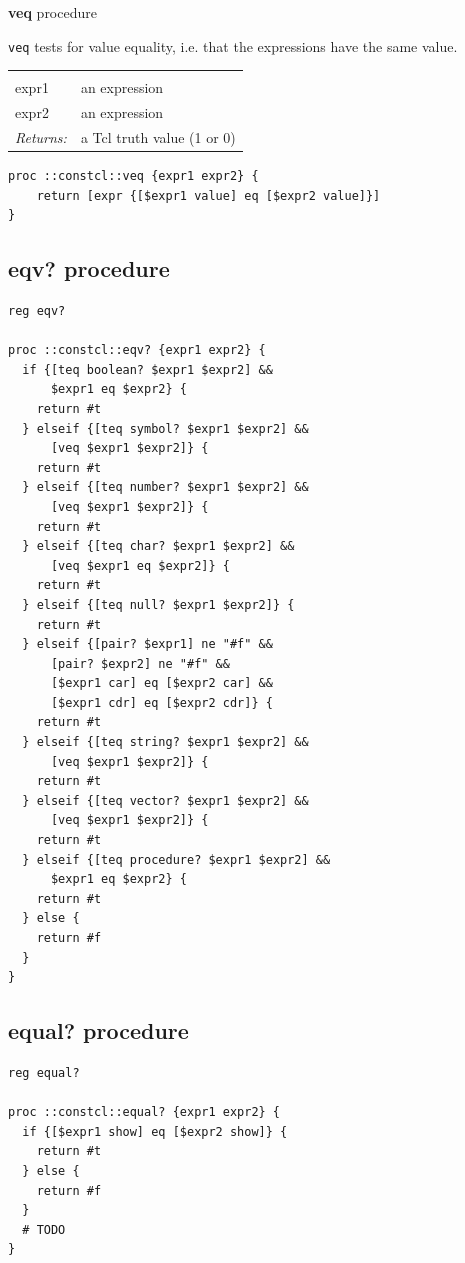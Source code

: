 \documentclass[twoside,9pt]{report}
\begin{document}
\textbf{veq} procedure


\texttt{veq} tests for value equality, i.e. that the expressions have the same value.

\noindent\begin{tabular}{ |p{1.5cm} p{8cm}| }
\hline
\rowcolor[HTML]{CCCCCC} \multicolumn{2}{|l|}{\bf veq (internal)} \\
expr1 & an expression \\
expr2 & an expression \\
\textit{Returns:} & a Tcl truth value (1 or 0) \\
\hline
\end{tabular}
\begin{lstlisting}
proc ::constcl::veq {expr1 expr2} {
    return [expr {[$expr1 value] eq [$expr2 value]}]
}
\end{lstlisting}
\subsection{eqv? procedure}
\label{eqv?-procedure}
\begin{lstlisting}
reg eqv?
 
proc ::constcl::eqv? {expr1 expr2} {
  if {[teq boolean? $expr1 $expr2] &&
      $expr1 eq $expr2} {
    return #t
  } elseif {[teq symbol? $expr1 $expr2] &&
      [veq $expr1 $expr2]} {
    return #t
  } elseif {[teq number? $expr1 $expr2] &&
      [veq $expr1 $expr2]} {
    return #t
  } elseif {[teq char? $expr1 $expr2] &&
      [veq $expr1 eq $expr2]} {
    return #t
  } elseif {[teq null? $expr1 $expr2]} {
    return #t
  } elseif {[pair? $expr1] ne "#f" &&
      [pair? $expr2] ne "#f" &&
      [$expr1 car] eq [$expr2 car] &&
      [$expr1 cdr] eq [$expr2 cdr]} {
    return #t
  } elseif {[teq string? $expr1 $expr2] &&
      [veq $expr1 $expr2]} {
    return #t
  } elseif {[teq vector? $expr1 $expr2] &&
      [veq $expr1 $expr2]} {
    return #t
  } elseif {[teq procedure? $expr1 $expr2] &&
      $expr1 eq $expr2} {
    return #t
  } else {
    return #f
  }
}
\end{lstlisting}
\subsection{equal? procedure}
\label{equal?-procedure}
\begin{lstlisting}
reg equal?
 
proc ::constcl::equal? {expr1 expr2} {
  if {[$expr1 show] eq [$expr2 show]} {
    return #t
  } else {
    return #f
  }
  # TODO
}
\end{lstlisting}
\end{document}
